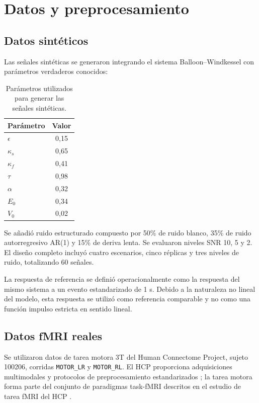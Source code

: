 \section{Datos y preprocesamiento}

\subsection{Datos sintéticos}

Las señales sintéticas se generaron integrando el sistema Balloon--Windkessel con parámetros verdaderos conocidos:

\begin{table}[H]
\centering
\caption{Parámetros utilizados para generar las señales sintéticas.}
\label{tab:synthetic_parameters}
\begin{tabular}{lc}
\toprule
Parámetro & Valor \\
\midrule
$\epsilon$ & 0,15 \\
$\kappa_s$ & 0,65 \\
$\kappa_f$ & 0,41 \\
$\tau$ & 0,98 \\
$\alpha$ & 0,32 \\
$E_0$ & 0,34 \\
$V_0$ & 0,02 \\
\bottomrule
\end{tabular}
\end{table}

Se añadió ruido estructurado compuesto por 50\% de ruido blanco, 35\% de ruido autorregresivo AR(1) y 15\% de deriva lenta. Se evaluaron niveles SNR 10, 5 y 2. El diseño completo incluyó cuatro escenarios, cinco réplicas y tres niveles de ruido, totalizando 60 señales.

La respuesta de referencia se definió operacionalmente como la respuesta del mismo sistema a un evento estandarizado de 1 s. Debido a la naturaleza no lineal del modelo, esta respuesta se utilizó como referencia comparable y no como una función impulso estricta en sentido lineal.

\subsection{Datos fMRI reales}

Se utilizaron datos de tarea motora 3T del Human Connectome Project, sujeto 100206, corridas \texttt{MOTOR\_LR} y \texttt{MOTOR\_RL}. El HCP proporciona adquisiciones multimodales y protocolos de preprocesamiento estandarizados \citep{VanEssen2013,Glasser2013}; la tarea motora forma parte del conjunto de paradigmas task-fMRI descritos en el estudio de tarea fMRI del HCP \citep{Barch2013}.

